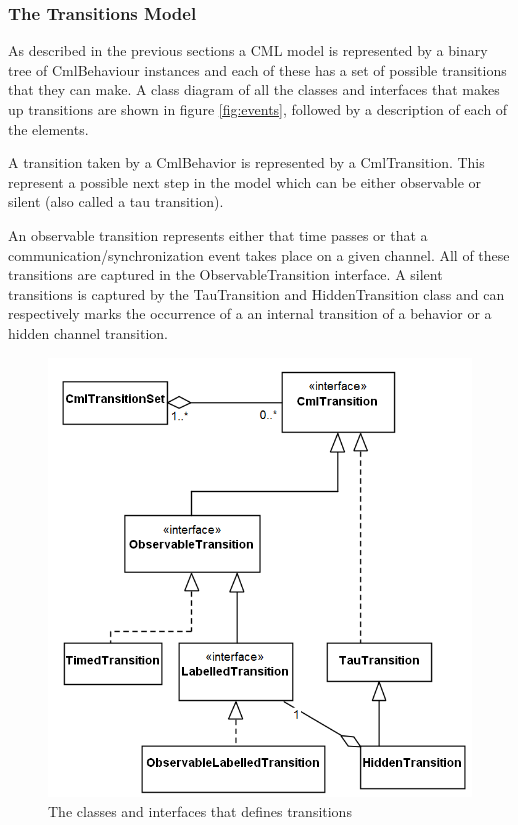 \documentclass[a4paper, 10pt]{include/compassreport}   %
\begin{document}
\subsubsection*{The Transitions Model}
\label{sec:transition_model}

As described in the previous sections a CML model is represented by a
binary tree of CmlBehaviour instances and each of these has a set of
possible transitions that they can make. A class diagram of all the
classes and interfaces that makes up transitions are shown in figure
\ref{fig:events}, followed by a description of each of the elements.

A transition taken by a CmlBehavior is represented by a
CmlTransition. This represent a possible next step in the model which
can be either observable or silent (also called a tau transition).

An observable transition represents either that time passes or that a
communication/synchronization event takes place on a given
channel. All of these transitions are captured in the
ObservableTransition interface.  A silent transitions is captured by
the TauTransition and HiddenTransition class and can respectively
marks the occurrence of a an internal transition of a behavior or a
hidden channel transition.

\begin{figure}[ht!]
  \begin{center}
    \includegraphics[width=1\textwidth]{figures/transition-structure}
    \caption{The classes and interfaces that defines transitions}
    \label{fig:transition_structure}
  \end{center}
\end{figure}
\end{document}

